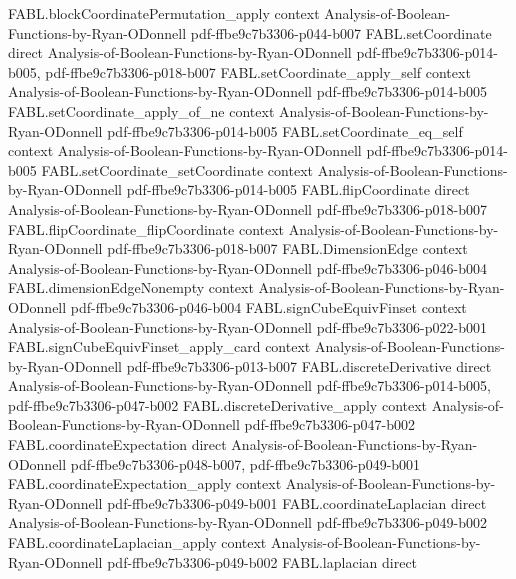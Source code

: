 \begin{theorem}
\proofstep
  {FABL.blockCoordinatePermutation_apply}
  {context}
  {Analysis-of-Boolean-Functions-by-Ryan-ODonnell}
  {pdf-ffbe9c7b3306-p044-b007}
\proofstep
  {FABL.setCoordinate}
  {direct}
  {Analysis-of-Boolean-Functions-by-Ryan-ODonnell}
  {pdf-ffbe9c7b3306-p014-b005,
    pdf-ffbe9c7b3306-p018-b007}
\proofstep
  {FABL.setCoordinate_apply_self}
  {context}
  {Analysis-of-Boolean-Functions-by-Ryan-ODonnell}
  {pdf-ffbe9c7b3306-p014-b005}
\proofstep
  {FABL.setCoordinate_apply_of_ne}
  {context}
  {Analysis-of-Boolean-Functions-by-Ryan-ODonnell}
  {pdf-ffbe9c7b3306-p014-b005}
\proofstep
  {FABL.setCoordinate_eq_self}
  {context}
  {Analysis-of-Boolean-Functions-by-Ryan-ODonnell}
  {pdf-ffbe9c7b3306-p014-b005}
\proofstep
  {FABL.setCoordinate_setCoordinate}
  {context}
  {Analysis-of-Boolean-Functions-by-Ryan-ODonnell}
  {pdf-ffbe9c7b3306-p014-b005}
\proofstep
  {FABL.flipCoordinate}
  {direct}
  {Analysis-of-Boolean-Functions-by-Ryan-ODonnell}
  {pdf-ffbe9c7b3306-p018-b007}
\proofstep
  {FABL.flipCoordinate_flipCoordinate}
  {context}
  {Analysis-of-Boolean-Functions-by-Ryan-ODonnell}
  {pdf-ffbe9c7b3306-p018-b007}
\proofstep
  {FABL.DimensionEdge}
  {context}
  {Analysis-of-Boolean-Functions-by-Ryan-ODonnell}
  {pdf-ffbe9c7b3306-p046-b004}
\proofstep
  {FABL.dimensionEdgeNonempty}
  {context}
  {Analysis-of-Boolean-Functions-by-Ryan-ODonnell}
  {pdf-ffbe9c7b3306-p046-b004}
\proofstep
  {FABL.signCubeEquivFinset}
  {context}
  {Analysis-of-Boolean-Functions-by-Ryan-ODonnell}
  {pdf-ffbe9c7b3306-p022-b001}
\proofstep
  {FABL.signCubeEquivFinset_apply_card}
  {context}
  {Analysis-of-Boolean-Functions-by-Ryan-ODonnell}
  {pdf-ffbe9c7b3306-p013-b007}
\proofstep
  {FABL.discreteDerivative}
  {direct}
  {Analysis-of-Boolean-Functions-by-Ryan-ODonnell}
  {pdf-ffbe9c7b3306-p014-b005,
    pdf-ffbe9c7b3306-p047-b002}
\proofstep
  {FABL.discreteDerivative_apply}
  {context}
  {Analysis-of-Boolean-Functions-by-Ryan-ODonnell}
  {pdf-ffbe9c7b3306-p047-b002}
\proofstep
  {FABL.coordinateExpectation}
  {direct}
  {Analysis-of-Boolean-Functions-by-Ryan-ODonnell}
  {pdf-ffbe9c7b3306-p048-b007,
    pdf-ffbe9c7b3306-p049-b001}
\proofstep
  {FABL.coordinateExpectation_apply}
  {context}
  {Analysis-of-Boolean-Functions-by-Ryan-ODonnell}
  {pdf-ffbe9c7b3306-p049-b001}
\proofstep
  {FABL.coordinateLaplacian}
  {direct}
  {Analysis-of-Boolean-Functions-by-Ryan-ODonnell}
  {pdf-ffbe9c7b3306-p049-b002}
\proofstep
  {FABL.coordinateLaplacian_apply}
  {context}
  {Analysis-of-Boolean-Functions-by-Ryan-ODonnell}
  {pdf-ffbe9c7b3306-p049-b002}
\proofstep
  {FABL.laplacian}
  {direct}

\end{theorem}
